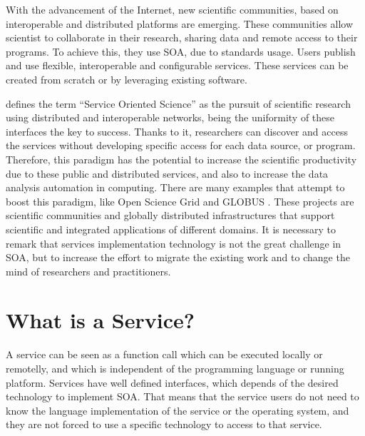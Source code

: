 With the advancement of the Internet, new scientific communities, based on interoperable and distributed platforms are emerging. These communities allow scientist to collaborate in their research, sharing data and remote access to their programs. To achieve this, they use SOA, due to standards usage. Users publish and use flexible, interoperable and configurable services. These services can be created from scratch or by leveraging existing software. 

 \cite{Foster2005Science} defines the term ``Service Oriented
Science'' as the pursuit of scientific research using distributed and
interoperable networks, being the uniformity of
these interfaces the key to success. Thanks to it, researchers can discover and access
the services without developing specific access for each data source, or
program. Therefore, this paradigm has the potential to increase the
scientific productivity due to these public and distributed services, and also to increase the data analysis automation in computing. There are many examples that attempt to boost this paradigm, like Open Science Grid \citep{Altunay2011OpenScience} and GLOBUS \citep{Foster2005Globus}. These projects are scientific communities and globally distributed infrastructures that support scientific and integrated applications of different domains.
It is necessary to remark that services implementation technology is not the
great challenge in SOA, but to increase the effort to migrate the
existing work and to change the mind of researchers and
practitioners. 

\section{What is a Service?}

\lettrine{A}{} service can be seen as a function call which can be executed locally or remotelly, and which is independent of the programming language or running platform. Services have well defined interfaces, which depends of the desired technology to implement SOA. That means that the service users do not need to know the language implementation of the service or the operating system, and they are not forced to use a specific technology to access to that service.

